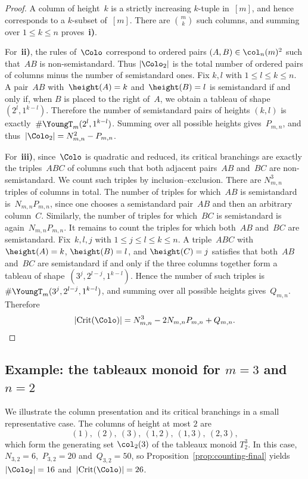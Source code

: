 \documentclass[a4paper, twoside, 11pt, english]{article}
\begin{document}
\begin{proof}
A column of height~$k$ is a strictly increasing $k$-tuple in~$[m]$, and hence
corresponds to a $k$-subset of~$[m]$.
There are $\displaystyle \binom{m}{k}$ such columns, and summing over $1\le k\le n$ proves~{\bf i)}.

For~{\bf ii)}, the rules of~$\Colo$ correspond to ordered pairs
$(A,B)\in\col_n(m)^2$ such that~$AB$ is non-semistandard.
Thus $|\Colo_2|$ is the total number of ordered pairs of columns minus the number of semistandard ones.
Fix $k,l$ with $1\le l\le k\le n$.
A pair~$AB$ with~$\height(A)=k$ and~$\height(B)=l$ is semistandard if and only if, when $B$ is placed to the right of~$A$, we obtain a tableau of shape~$(2^l,1^{k-l})$.
Therefore the number of semistandard pairs of heights $(k,l)$ is exactly~$\displaystyle \#\YoungT_m(2^l,1^{k-l})$.
Summing over all possible heights gives~$P_{m,n}$, and thus~$|\Colo_2|=N_{m,n}^2-P_{m,n}$.


For~{\bf iii)}, since~$\Colo$ is quadratic and reduced, its critical branchings are exactly the triples~$ABC$ of columns such that both adjacent pairs~$AB$ and~$BC$ are non-semistandard.
We count such triples by inclusion--exclusion.
There are $N_{m,n}^3$ triples of columns in total.
The number of triples for which~$AB$ is semistandard is~$N_{m,n}P_{m,n}$, since one chooses a semistandard pair~$AB$ and then an arbitrary column~$C$.
Similarly, the number of triples for which~$BC$ is semistandard is again~$N_{m,n}P_{m,n}$.
It remains to count the triples for which both~$AB$ and~$BC$ are semistandard.
Fix~$k,l,j$ with $1\le j\le l\le k\le n$.
A triple~$ABC$ with $\height(A)=k$, $\height(B)=l$, and $\height(C)=j$
satisfies that both~$AB$ and~$BC$ are semistandard if and only if the three columns together form a tableau of shape~$(3^j,2^{l-j},1^{k-l})$.
Hence the number of such triples is~$\displaystyle \#\YoungT_m(3^j,2^{l-j},1^{k-l})$,
and summing over all possible heights gives~$Q_{m,n}$.
Therefore
\[|\mathrm{Crit}(\Colo)|
=
N_{m,n}^3-2N_{m,n}P_{m,n}+Q_{m,n}.
\]
\end{proof}


\subsection{Example: the tableaux monoid for $m=3$ and $n=2$}
We illustrate the column presentation and its critical branchings
in a small representative case.
The columns of height at most $2$ are
\[
(1),\ (2),\ (3),\ (1,2),\ (1,3),\ (2,3),
\]
which form the generating set $\col_2(3)$ of the tableaux monoid $T_2^3$. 
In this case,~$N_{3,2}=6$,~$P_{3,2}=20$ and~$Q_{3,2}=50$,
so Proposition~\ref{prop:counting-final} yields~$|\Colo_2|=16$ and~$|\mathrm{Crit}(\Colo)|=26$.
\end{document}
